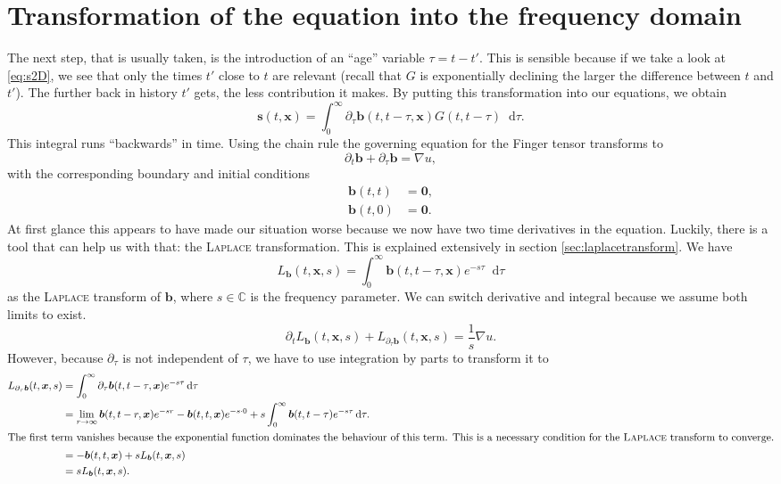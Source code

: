 \documentclass[12pt,a4paper,twoside, open=right]{scrreprt}
\theoremstyle{definition}
\theoremstyle{plain}
\newcommand{\cc}{\mathbb{C}}
\newcommand{\bfb}{\bm{b}}
\newcommand{\bfs}{\bm{s}}
\newcommand{\bfx}{\bm{x}}
\newcommand{\D}{\mathop{}\!\mathrm{d}}
\begin{document}
\section{Transformation of the equation into the frequency domain}
The next step, that is usually taken, is the introduction of an \enquote{age} variable $\tau=t-t'$. This is sensible because if we take a look at \eqref{eq:s2D}, we see that only the times $t'$ close to $t$ are relevant (recall that $G$ is exponentially declining the larger the difference between $t$ and $t'$). The further back in history $t'$ gets, the less contribution it makes. By putting this transformation into our equations, we obtain
\begin{equation}
    \bfs(t,\bfx)=\int_0^\infty\partial_\tau\bfb(t,t-\tau,\bfx)G(t,t-\tau)\D\tau.\label{eq:sage}
\end{equation}
This integral runs \enquote{backwards} in time. Using the chain rule the governing equation for the Finger tensor transforms to  
\begin{equation}
    \partial_t \bfb +\partial_\tau\bfb = \nabla u,
\end{equation}
with the corresponding boundary and initial conditions
\begin{align}
    \bfb(t,t) &= \bm{0},\\
    \bfb(t,0) &= \bm{0}.
\end{align}
At first glance this appears to have made our situation worse because we now have two time derivatives in the equation. Luckily, there is a tool that can help us with that: the \textsc{Laplace} transformation. This is explained extensively in section \ref{sec:laplacetransform}. We have
\begin{equation}
L_{\bfb}(t,\bfx,s) =\int_0^\infty\bfb(t,t-\tau,\bfx)e^{-s\tau}\D\tau
\end{equation}
as the \textsc{Laplace} transform of $\bfb$, where $s\in\cc$ is the frequency parameter. 
We can switch derivative and integral because we assume both limits to exist.
\begin{equation}
    \partial_tL_{\bfb}(t,\bfx,s) + L_{\partial_\tau\bfb}(t,\bfx,s) = \frac{1}{s}\nabla u.
\end{equation}
However, because $\partial_\tau$ is not independent of $\tau$, we have to use integration by parts to transform it to
\begin{align}
    L_{\partial_\tau\bfb}(t,\bfx,s) &= \int_0^\infty\partial_\tau\bfb(t,t-\tau,\bfx)e^{-s\tau}\D\tau\\ &=\lim_{r\to\infty}\bfb(t,t-r,\bfx)e^{-sr}-\bfb(t,t,\bfx)e^{-s\cdot 0}+s\int_0^\infty\bfb(t,t-\tau)e^{-s\tau}\D\tau.\\
    \intertext{The first term vanishes because the exponential function dominates the behaviour of this term. This is a necessary condition for the \textsc{Laplace} transform to converge.}
    &= -\bfb(t,t,\bfx) +sL_{\bfb}(t,\bfx, s)\\
    &= sL_{\bfb}(t,\bfx,s).
\end{align}
\end{document}

